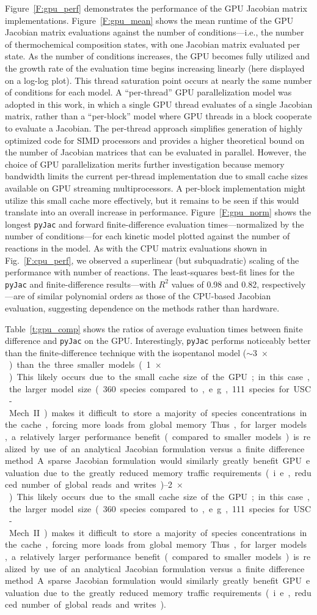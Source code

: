 \documentclass[preprint,12pt]{elsarticle}
\begin{document}
{Figure~\ref{F:gpu_perf} demonstrates the performance of the GPU Jacobian matrix implementations.
Figure~\ref{F:gpu_mean} shows the mean runtime of the GPU Jacobian matrix evaluations against the number of conditions---i.e., the number of thermochemical composition states, with one Jacobian matrix evaluated per state.
As the number of conditions increases, the GPU becomes fully utilized and the growth rate of the evaluation time begins increasing linearly (here displayed on a log-log plot).
This thread saturation point occurs at nearly the same number of conditions for each model.
A ``per-thread'' GPU parallelization model was adopted in this work, in which a single GPU thread evaluates of a single Jacobian matrix, rather than a ``per-block'' model where GPU threads in a block cooperate to evaluate a Jacobian.
The per-thread approach simplifies generation of highly optimized code for SIMD processors and provides a higher theoretical bound on the number of Jacobian matrices that can be evaluated in parallel.
However, the choice of GPU parallelization merits further investigation because memory bandwidth limits the current per-thread implementation due to small cache sizes available on GPU streaming multiprocessors.
A per-block implementation might utilize this small cache more effectively, but it remains to be seen if this would translate into an overall increase in performance.
Figure~\ref{F:gpu_norm} shows the longest \texttt{pyJac} and forward finite-difference evaluation times---normalized by the number of conditions---for each kinetic model plotted against the number of reactions in the model.
As with the CPU matrix evaluations shown in Fig.~\ref{F:cpu_perf}, we observed a superlinear (but subquadratic) scaling of the performance with number of reactions.
The least-squares best-fit lines for the \texttt{pyJac} and finite-difference results---with $R^2$ values of 0.98 and 0.82, respectively---are of similar polynomial orders as those of the CPU-based Jacobian evaluation, suggesting dependence on the methods rather than hardware.

Table~\ref{t:gpu_comp} shows the ratios of average evaluation times between finite difference and \texttt{pyJac} on the GPU.
Interestingly, \texttt{pyJac} performs noticeably better than the finite-difference technique with the isopentanol model ($\sim$\SI{3}{$\times$}) than the three smaller models (\SIrange{1}{2}{$\times$}).
This likely occurs due to the small cache size of the GPU; in this case, the larger model size (360 species compared to, e.g., 111 species for USC-Mech II) makes it difficult to store a majority of species concentrations in the cache, forcing more loads from global memory.
Thus, for larger models, a relatively larger performance benefit (compared to smaller models) is realized by use of an analytical Jacobian formulation versus a finite difference method.
A sparse Jacobian formulation would similarly greatly benefit GPU evaluation due to the greatly reduced memory traffic requirements (i.e., reduced number of global reads and writes).

}
\end{document}
